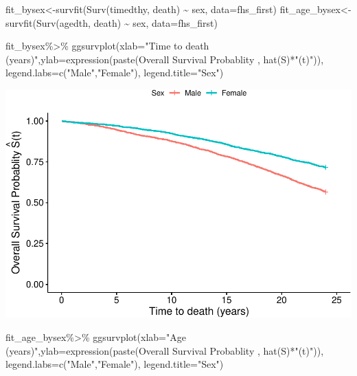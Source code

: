 \documentclass[
]{book}
\newenvironment{Shaded}{\begin{snugshade}}{\end{snugshade}}
\newcommand{\AttributeTok}[1]{\textcolor[rgb]{0.77,0.63,0.00}{#1}}
\newcommand{\FunctionTok}[1]{\textcolor[rgb]{0.00,0.00,0.00}{#1}}
\newcommand{\NormalTok}[1]{#1}
\newcommand{\OtherTok}[1]{\textcolor[rgb]{0.56,0.35,0.01}{#1}}
\newcommand{\SpecialCharTok}[1]{\textcolor[rgb]{0.00,0.00,0.00}{#1}}
\newcommand{\StringTok}[1]{\textcolor[rgb]{0.31,0.60,0.02}{#1}}
\begin{document}
\begin{Shaded}
\begin{Highlighting}[]
\NormalTok{fit\_bysex}\OtherTok{\textless{}{-}}\FunctionTok{survfit}\NormalTok{(}\FunctionTok{Surv}\NormalTok{(timedthy, death) }\SpecialCharTok{\textasciitilde{}}\NormalTok{ sex, }\AttributeTok{data=}\NormalTok{fhs\_first)}
\NormalTok{fit\_age\_bysex}\OtherTok{\textless{}{-}} \FunctionTok{survfit}\NormalTok{(}\FunctionTok{Surv}\NormalTok{(agedth, death) }\SpecialCharTok{\textasciitilde{}}\NormalTok{ sex, }\AttributeTok{data=}\NormalTok{fhs\_first)}

\NormalTok{fit\_bysex}\SpecialCharTok{\%\textgreater{}\%}
\FunctionTok{ggsurvplot}\NormalTok{(}\AttributeTok{xlab=}\StringTok{"Time to death (years)"}\NormalTok{,}\AttributeTok{ylab=}\FunctionTok{expression}\NormalTok{(}\FunctionTok{paste}\NormalTok{(}\StringTok{\textquotesingle{}Overall Survival Probablity \textquotesingle{}}\NormalTok{, }\FunctionTok{hat}\NormalTok{(S)}\SpecialCharTok{*}\StringTok{"(t)"}\NormalTok{)), }\AttributeTok{legend.labs=}\FunctionTok{c}\NormalTok{(}\StringTok{"Male"}\NormalTok{,}\StringTok{"Female"}\NormalTok{),}
  \AttributeTok{legend.title=}\StringTok{"Sex"}\NormalTok{)}
\end{Highlighting}
\end{Shaded}

\includegraphics{adv_epi_analysis_files/figure-latex/unnamed-chunk-196-1.pdf}

\begin{Shaded}
\begin{Highlighting}[]
\NormalTok{fit\_age\_bysex}\SpecialCharTok{\%\textgreater{}\%}
\FunctionTok{ggsurvplot}\NormalTok{(}\AttributeTok{xlab=}\StringTok{"Age (years)"}\NormalTok{,}\AttributeTok{ylab=}\FunctionTok{expression}\NormalTok{(}\FunctionTok{paste}\NormalTok{(}\StringTok{\textquotesingle{}Overall Survival Probablity \textquotesingle{}}\NormalTok{, }\FunctionTok{hat}\NormalTok{(S)}\SpecialCharTok{*}\StringTok{"(t)"}\NormalTok{)), }\AttributeTok{legend.labs=}\FunctionTok{c}\NormalTok{(}\StringTok{"Male"}\NormalTok{,}\StringTok{"Female"}\NormalTok{),}
  \AttributeTok{legend.title=}\StringTok{"Sex"}\NormalTok{)}
\end{Highlighting}
\end{Shaded}
\end{document}

